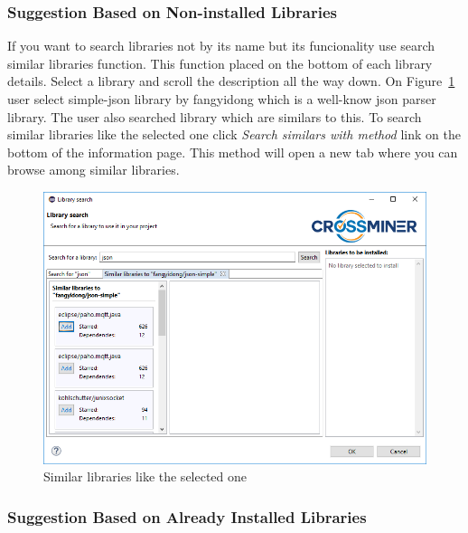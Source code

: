 \documentclass[11pt,a4paper]{book}
\begin{document}
\subsubsection{Suggestion Based on Non-installed Libraries}

If you want to search libraries not by its name but its funcionality use search similar libraries function. This function placed on the bottom of each library details. Select a library and scroll the description all the way down. On Figure~\ref{fig:librarySimilar} user select simple-json library by fangyidong which is a well-know json parser library. The user also searched library which are similars to this. To search similar libraries like the selected one click \textit{Search similars with method} link on the bottom of the information page. This method will open a new tab where you can browse among similar libraries.

\begin{figure}[h]
	\centering
	\includegraphics[width=\linewidth]{pic/librarySearchSimilars.png}
	\caption{Similar libraries like the selected one}
	\label{fig:librarySimilar}
\end{figure}

\subsubsection{Suggestion Based on Already Installed Libraries}
\end{document}
